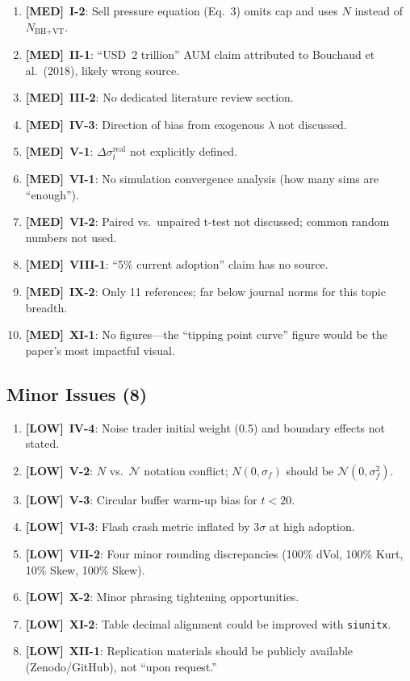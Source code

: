 \documentclass[12pt,a4paper]{article}
\newcommand{\MED}{\textbf{\textcolor{warncolor}{[MED]}}}
\newcommand{\LOW}{\textbf{\textcolor{okgreen}{[LOW]}}}
\begin{document}
\begin{enumerate}
  \item \MED\ \textbf{I-2}: Sell pressure equation (Eq.~3) omits cap and uses $N$ instead of $N_{\text{BH+VT}}$.
  \item \MED\ \textbf{II-1}: ``USD~2 trillion'' AUM claim attributed to Bouchaud et al.\ (2018), likely wrong source.
  \item \MED\ \textbf{III-2}: No dedicated literature review section.
  \item \MED\ \textbf{IV-3}: Direction of bias from exogenous $\lambda$ not discussed.
  \item \MED\ \textbf{V-1}: $\Delta\sigma^{\text{real}}_t$ not explicitly defined.
  \item \MED\ \textbf{VI-1}: No simulation convergence analysis (how many sims are ``enough'').
  \item \MED\ \textbf{VI-2}: Paired vs.\ unpaired t-test not discussed; common random numbers not used.
  \item \MED\ \textbf{VIII-1}: ``5\% current adoption'' claim has no source.
  \item \MED\ \textbf{IX-2}: Only 11 references; far below journal norms for this topic breadth.
  \item \MED\ \textbf{XI-1}: No figures---the ``tipping point curve'' figure would be the paper's most impactful visual.
\end{enumerate}

\subsection*{Minor Issues (8)}

\begin{enumerate}
  \item \LOW\ \textbf{IV-4}: Noise trader initial weight (0.5) and boundary effects not stated.
  \item \LOW\ \textbf{V-2}: $N$ vs.\ $\mathcal{N}$ notation conflict; $N(0, \sigma_f)$ should be $\mathcal{N}(0, \sigma_f^2)$.
  \item \LOW\ \textbf{V-3}: Circular buffer warm-up bias for $t < 20$.
  \item \LOW\ \textbf{VI-3}: Flash crash metric inflated by $3\sigma$ at high adoption.
  \item \LOW\ \textbf{VII-2}: Four minor rounding discrepancies (100\% dVol, 100\% Kurt, 10\% Skew, 100\% Skew).
  \item \LOW\ \textbf{X-2}: Minor phrasing tightening opportunities.
  \item \LOW\ \textbf{XI-2}: Table decimal alignment could be improved with \texttt{siunitx}.
  \item \LOW\ \textbf{XII-1}: Replication materials should be publicly available (Zenodo/GitHub), not ``upon request.''
\end{enumerate}
\end{document}
